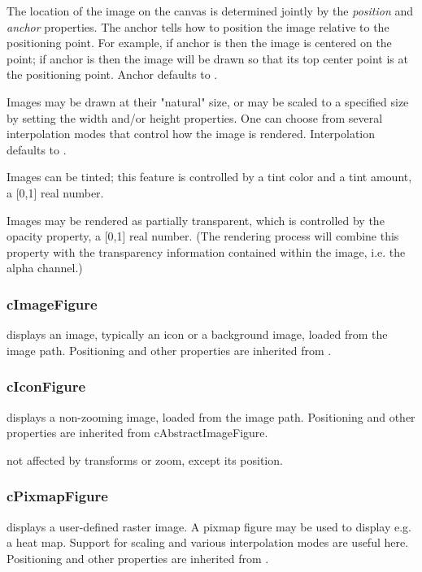 The location of the image on the canvas is determined jointly by the
\textit{position} and \textit{anchor} properties. The anchor tells how to
position the image relative to the positioning point. For example,
if anchor is  then the image is centered on the point;
if anchor is  then the image will be drawn so that its top center
point is at the positioning point. Anchor defaults to .

Images may be drawn at their "natural" size, or may be scaled to a
specified size by setting the width and/or height properties. One can
choose from several interpolation modes that control how the image is
rendered. Interpolation defaults to .

Images can be tinted; this feature is controlled by a tint color and
a tint amount, a [0,1] real number.

Images may be rendered as partially transparent, which is controlled
by the opacity property, a [0,1] real number. (The rendering process
will combine this property with the transparency information contained
within the image, i.e. the alpha channel.)

\subsubsection{cImageFigure}

 displays an image, typically an icon or a background image,
loaded from the {\opp} image path. Positioning and other properties
are inherited from .

\subsubsection{cIconFigure}

 displays a non-zooming image, loaded from the {\opp}
image path. Positioning and other properties are inherited from
cAbstractImageFigure.

 not affected by transforms or zoom, except its position.

\subsubsection{cPixmapFigure}

 displays a user-defined raster image. A pixmap
figure may be used to display e.g. a heat map. Support for scaling and
various interpolation modes are useful here. Positioning and other
properties are inherited from .

